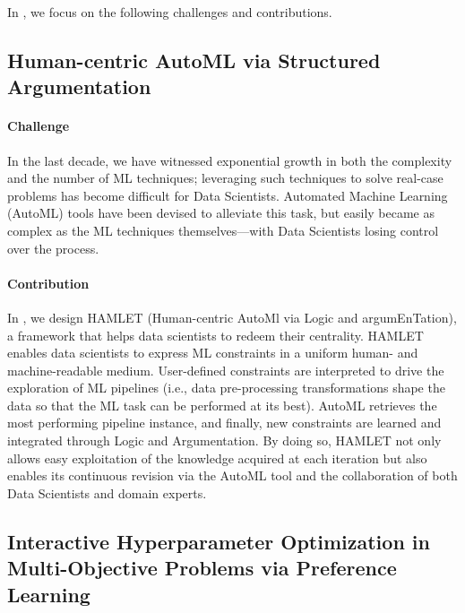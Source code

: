 In , we focus on the following challenges and contributions.

\subsection*{Human-centric AutoML via Structured Argumentation}

\paragraph{Challenge} In the last decade, we have witnessed exponential growth in both the complexity and the number of ML techniques; leveraging such techniques to solve real-case problems has become difficult for Data Scientists.
Automated Machine Learning (AutoML) tools have been devised to alleviate this task, but easily became as complex as the ML techniques themselves---with Data Scientists losing control over the process.

\paragraph{Contribution} In , we design HAMLET (Human-centric AutoMl via Logic and argumEnTation), a framework that helps data scientists to redeem their centrality.
HAMLET enables data scientists to express ML constraints in a uniform human- and machine-readable medium.
User-defined constraints are interpreted to drive the exploration of ML pipelines (i.e., data pre-processing transformations shape the data so that the ML task can be performed at its best).
AutoML retrieves the most performing pipeline instance, and finally, new constraints are learned and integrated through Logic and Argumentation.
By doing so, HAMLET not only allows easy exploitation of the knowledge acquired at each iteration but also enables its continuous revision via the AutoML tool and the collaboration of both Data Scientists and domain experts.


\subsection*{Interactive Hyperparameter Optimization in Multi-Objective Problems via Preference Learning}


